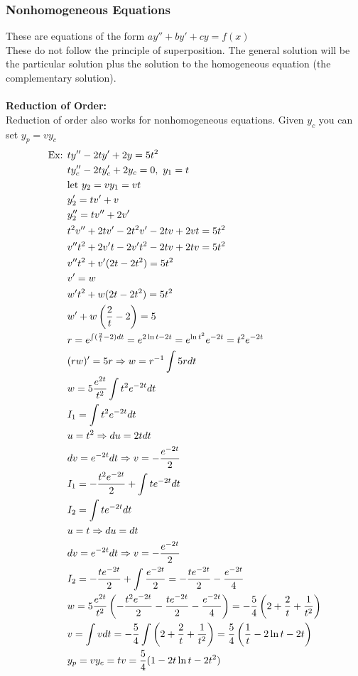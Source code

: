 \documentclass[11pt, fleqn]{article}
\begin{document}
\subsubsection{Nonhomogeneous Equations}
These are equations of the form $ay''+by'+cy=f(x)$\\
These do not follow the principle of superposition. The general solution will be the particular solution plus the solution to the homogeneous equation (the complementary solution).\\
\\
\textbf{Reduction of Order:}\\
Reduction of order also works for nonhomogeneous equations. Given $y_c$ you can set $y_p=vy_c$
\begin{align*}
    \text{Ex: }&ty''-2ty'+2y=5t^2\\
    &ty_c''-2ty_c'+2y_c=0,\ y_1=t\\
    &\text{let }y_2=vy_1=vt\\
    &y_2'=tv'+v\\
    &y_2''=tv''+2v'\\
    &t^2v''+2tv'-2t^2v'-2tv+2vt=5t^2\\
    &v''t^2+2v't-2v't^2-2tv+2tv=5t^2\\
    &v''t^2+v'(2t-2t^2)=5t^2\\
    &v'=w\\
    &w't^2+w(2t-2t^2)=5t^2\\
    &w'+w\left( \frac{2}{t}-2 \right)=5\\
    &r=e^{\int(\frac{2}{t}-2)dt}=e^{2\ln t-2t}=e^{\ln t^2}e^{-2t}=t^2e^{-2t}\\
    &(rw)'=5r\Rightarrow w=r^{-1}\int 5rdt\\
    &w=5\frac{e^{2t}}{t^2}\int t^2e^{-2t}dt\\
    &I_1=\int t^2e^{-2t}dt\\
    &u=t^2\Rightarrow du=2tdt\\
    &dv=e^{-2t}dt\Rightarrow v=-\frac{e^{-2t}}{2}\\
    &I_1=-\frac{t^2e^{-2t}}{2}+\int te^{-2t}dt\\
    &I_2=\int te^{-2t}dt\\
    &u=t\Rightarrow du=dt\\
    &dv=e^{-2t}dt\Rightarrow v=-\frac{e^{-2t}}{2}\\
    &I_2=-\frac{te^{-2t}}{2}+\int\frac{e^{-2t}}{2}=-\frac{te^{-2t}}{2}-\frac{e^{-2t}}{4}\\
    &w=5\frac{e^{2t}}{t^2}\left( -\frac{t^2e^{-2t}}{2}-\frac{te^{-2t}}{2}-\frac{e^{-2t}}{4} \right)=-\frac{5}{4}\left( 2+\frac{2}{t}+\frac{1}{t^2} \right)\\
    &v=\int vdt=-\frac{5}{4}\int\left( 2+\frac{2}{t}+\frac{1}{t^2} \right)=\frac{5}{4}\left( \frac{1}{t}-2\ln t-2t \right)\\
    &y_p=vy_c=tv=\frac{5}{4}(1-2t\ln t-2t^2)
\end{align*}
\end{document}
